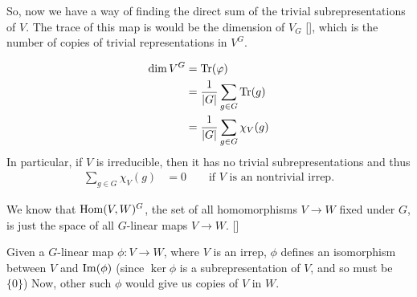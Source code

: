 So, now we have a way of finding the direct sum of the trivial subrepresentations of $V$. The trace of this map is would be the dimension of $V_G$ [], which is the number of copies of trivial representations in $V^G$.

\begin{insight}
\end{insight}

\begin{align}
    \dim V^G &= \operatorname{Tr} (\varphi)\\
        &= \frac{1}{|G|}\sum_{g\in G} \operatorname{Tr}(g)\\
        &= \frac{1}{|G|}\sum_{g\in G}\chi_V(g)
        \label{eqn:dimV_G}
\end{align}
In particular, if $V$ is irreducible, then it has no trivial subrepresentations and thus
\begin{align}
    \sum_{g\in G} \chi_V(g) &= 0\quad\quad\text{if $V$ is an nontrivial irrep}.
\end{align}

We know that $\operatorname{Hom}(V,W)^G$, the set of all homomorphisms $V\to W$ fixed under $G$, is just the space of all $G$-linear maps $V\to W$. []
\begin{insight}
    Given a $G$-linear map $\phi: V\to W$, where $V$ is an irrep, $\phi$ defines an isomorphism between $V$ and $\operatorname{Im}(\phi)$ (since $\ker \phi$ is a subrepresentation of $V$, and so must be $\{0\}$) Now, other such $\phi$ would give us copies of $V$ in $W$. 
\end{insight}

